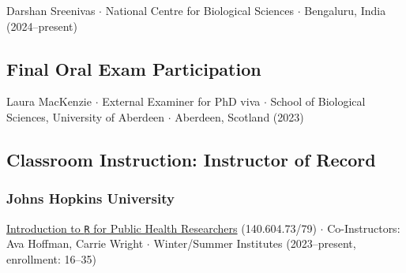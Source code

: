 \documentclass{cv}
\begin{document}
Darshan Sreenivas $\cdot$ National Centre for Biological Sciences $\cdot$ Bengaluru, India (2024--present)






\subsection*{Final Oral Exam Participation}

Laura MacKenzie $\cdot$ External Examiner for PhD viva $\cdot$ School of Biological Sciences, University of Aberdeen $\cdot$ Aberdeen, Scotland (2023)

\subsection*{Classroom Instruction: Instructor of Record}

\subsubsection*{Johns Hopkins University}

\href{https://jhudatascience.org/intro_to_r/}{Introduction to \texttt{R} for Public Health Researchers} (140.604.73/79) $\cdot$ Co-Instructors: Ava Hoffman, Carrie Wright $\cdot$ Winter/Summer Institutes (2023--present, enrollment: 16--35)
\end{document}
